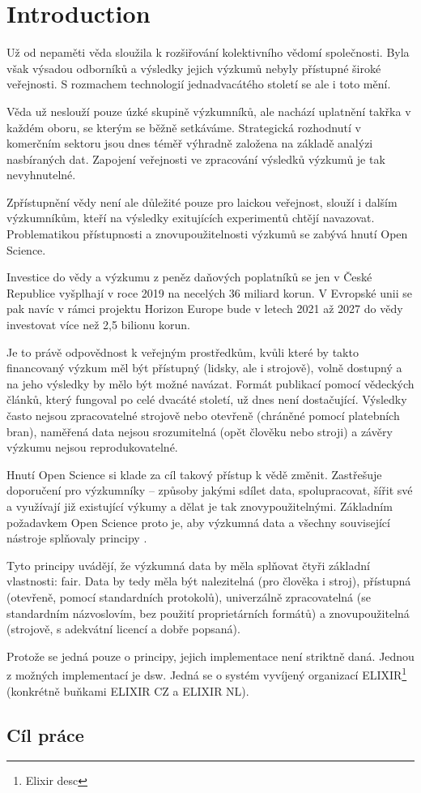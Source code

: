 \chapter{Introduction}

Už od nepaměti věda sloužila k rozšiřování kolektivního vědomí společnosti.
Byla však výsadou odborníků a výsledky jejich výzkumů nebyly přístupné široké veřejnosti.
S rozmachem technologií jednadvacátého století se ale i toto mění.

Věda už neslouží pouze úzké skupině výzkumníků, ale nachází uplatnění takřka v každém oboru, se kterým se běžně setkáváme.
Strategická rozhodnutí v komerčním sektoru jsou dnes téměř výhradně založena na základě analýzi nasbíraných dat.
Zapojení veřejnosti ve zpracování výsledků výzkumů je tak nevyhnutelné.

Zpřístupnění vědy není ale důležité pouze pro laickou veřejnost, slouží i dalším výzkumníkům, kteří na výsledky exitujících experimentů chtějí navazovat.
Problematikou přístupnosti a znovupoužitelnosti výzkumů se zabývá hnutí Open Science.

Investice do vědy a výzkumu z peněz daňových poplatníků se jen v České Republice vyšplhají v roce 2019 na necelých 36 miliard korun\cite{rvvi-budget}.
V Evropské unii se pak navíc v rámci projektu Horizon Europe bude v letech 2021 až 2027 do vědy investovat více než 2,5 bilionu korun\cite{euc-horizon-budget}.

Je to právě odpovědnost k veřejným prostředkům, kvůli které by takto financovaný výzkum měl být přístupný (lidsky, ale i strojově), volně dostupný a na jeho výsledky by mělo být možné navázat.
Formát publikací pomocí vědeckých článků, který fungoval po celé dvacáté století, už dnes není dostačující.
Výsledky často nejsou zpracovatelné strojově nebo otevřeně (chráněné pomocí platebních bran),
naměřená data nejsou srozumitelná (opět člověku nebo stroji) a závěry výzkumu nejsou reprodukovatelné.

Hnutí Open Science si klade za cíl takový přístup k vědě změnit.
Zastřešuje doporučení pro výzkumníky -- způsoby jakými sdílet data, spolupracovat, šířit své a využívají již existující výkumy a dělat je tak znovypoužitelnými.
Základním požadavkem Open Science proto je, aby výzkumná data a všechny související nástroje splňovaly principy .

Tyto principy uvádějí, že výzkumná data by měla splňovat čtyři základní vlastnosti: \gls{fair}.
Data by tedy měla být nalezitelná (pro člověka i stroj), přístupná (otevřeně, pomocí standardních protokolů), univerzálně zpracovatelná (se standardním názvoslovím, bez použití proprietárních formátů) a znovupoužitelná (strojově, s adekvátní licencí a dobře popsaná).

Protože se jedná pouze o principy, jejich implementace není striktně daná.
Jednou z možných implementací je \gls{dsw}.
Jedná se o systém vyvíjený organizací ELIXIR\footnote{Elixir desc} (konkrétně buňkami ELIXIR CZ a ELIXIR NL).

\section*{Cíl práce}